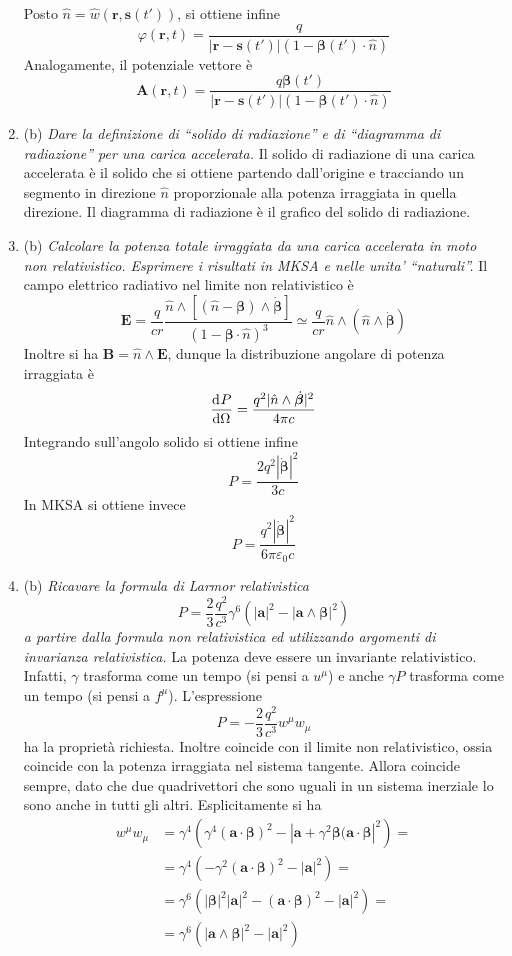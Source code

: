 \documentclass{article}
\renewcommand{\b}{(b)}
\renewcommand{\t}[1]{\textit{ #1}}
\renewcommand{\vec}[1]{\mathbf{#1}}
\begin{document}
\begin{enumerate}
		Posto $\hat{n}=\hat{w}(\vec{r},\vec{s}(t'))$, si ottiene infine
		\[\varphi(\vec{r},t)=\frac{q}{|\vec{r}-\vec{s}(t')|(1-\bm{\beta}(t')\cdot\hat{n})}\]
		Analogamente, il potenziale vettore è
		\[\vec{A}(\vec{r},t)=\frac{q\bm{\beta}(t')}{|\vec{r}-\vec{s}(t')|(1-\bm{\beta}(t')\cdot\hat{n})}\]
	\item\b\t{Dare la definizione di “solido di radiazione” e di “diagramma di radiazione” per
		una carica accelerata.} Il solido di radiazione di una carica accelerata è il solido che si ottiene partendo dall'origine e tracciando un segmento in direzione $\hat{n}$ proporzionale alla potenza irraggiata in quella direzione. Il diagramma di radiazione è il grafico del solido di radiazione.
	\item\b\t{Calcolare la potenza totale irraggiata da una carica accelerata in moto non
		relativistico. Esprimere i risultati in MKSA e nelle unita’ “naturali”.}
		Il campo elettrico radiativo nel limite non relativistico è
		\[\vec{E}=\frac{q}{cr}\frac{\hat{n}\wedge[(\hat{n}-\bm{\beta})\wedge\dot{\bm{\beta}}]}{(1-\bm{\beta}\cdot\hat{n})^{3}}\simeq\frac{q}{cr}\hat{n}\wedge(\hat{n}\wedge\dot{\bm{\beta}})\]
		Inoltre si ha $\vec{B}=\hat{n}\wedge\vec{E}$, dunque la distribuzione angolare di potenza irraggiata è
		\[\dfrac{\mathrm{d} ^{}P}{\mathrm{d} {\Omega}^{}}=\frac{q^2|\hat{n}\wedge\dot{\bm{\beta}}|^2}{4\pi c}\]
		Integrando sull'angolo solido si ottiene infine
		\[P=\frac{2q^2|\dot{\bm{\beta}}|^2}{3c}\]
		In MKSA si ottiene invece
		\[P=\frac{q^2|\dot{\bm{\beta}}|^2}{6\pi\varepsilon_0 c}\]
	\item\b\t{Ricavare la formula di Larmor relativistica \[P = \frac{2}{3}\frac{q^2}{c^3}\gamma^6\left(|\vec{a}|^2-|\vec{a}\wedge\bm{\beta}|^2\right)\] a partire dalla
		formula non relativistica ed utilizzando argomenti di invarianza relativistica.}
	La potenza deve essere un invariante relativistico. Infatti, $\gamma$ trasforma come un tempo (si pensi a $u^\mu$) e anche $\gamma P$ trasforma come un tempo (si pensi a $f^\mu$). L'espressione
	\[P=-\frac{2}{3}\frac{q^2}{c^3}w^\mu w_\mu\]
	ha la proprietà richiesta. Inoltre coincide con il limite non relativistico, ossia coincide con la potenza irraggiata nel sistema tangente. Allora coincide sempre, dato che due quadrivettori che sono uguali in un sistema inerziale lo sono anche in tutti gli altri. Esplicitamente si ha
	\begin{align*}w^\mu w_\mu&=\gamma^4\left(\gamma^4(\vec{a}\cdot\bm{\beta})^2-|\vec{a}+\gamma^2\bm{\beta}(\vec{a}\cdot\bm{\beta}|^2\right)=\\&=\gamma^4(-\gamma^2(\vec{a}\cdot\bm{\beta})^2-|\vec{a}|^2)=\\&=\gamma^6(|\bm{\beta}|^2|\vec{a}|^2-(\vec{a}\cdot\bm{\beta})^2-|\vec{a}|^2)=\\&=\gamma^6(|\vec{a}\wedge\bm{\beta}|^2-|\vec{a}|^2)\end{align*}

\end{enumerate}
\end{document}
